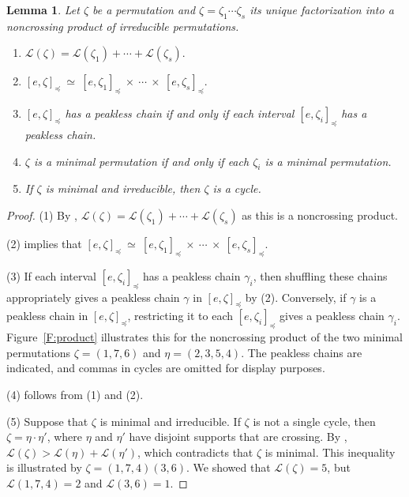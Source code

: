 \documentclass[12pt,oneside,reqno]{amsart}
\newtheorem{lemma}[theorem]{Lemma}
\theoremstyle{definition}
\numberwithin{equation}{section}
\newcommand{\calL}{{\mathcal L}}
\begin{document}
\begin{lemma}\label{L:properties-noncrossing-products}
    Let $\zeta$ be a permutation and $\zeta=\zeta_1\dotsb \zeta_s$ its unique
    factorization into a noncrossing product of irreducible permutations.
    \begin{enumerate}
        \item
            $\calL(\zeta)= \calL(\zeta_1)+\dotsb+\calL(\zeta_s).$

        \item
            $[e,\zeta]_\preceq\ \simeq\  [e,\zeta_1]_\preceq\ \times\ \dotsb\ \times\  [e,\zeta_s]_\preceq.$

        \item
            $[e,\zeta]_\preceq$ has a peakless chain if and only if each interval $[e,\zeta_i]_\preceq$ has a peakless chain.

        \item
            $\zeta$ is a minimal permutation if and only if each $\zeta_i$ is a minimal permutation.

        \item
            If $\zeta$ is minimal and irreducible, then $\zeta$ is a cycle.
    \end{enumerate}
\end{lemma}

\begin{proof}
    (1) By \cite[Lem.~3.3.1]{BS-Bruhat}, $\calL(\zeta)= \calL(\zeta_1)+\dotsb+\calL(\zeta_s)$ as this is a noncrossing product.

    (2) \cite[Lem.~3.3.3]{BS-Bruhat} implies that $[e,\zeta]_\preceq\ \simeq\  [e,\zeta_1]_\preceq\ \times\ \dotsb\ \times\  [e,\zeta_s]_\preceq$.

    (3) If each interval $[e, \zeta_i]_{\preceq}$ has a peakless chain
        $\gamma_i$, then shuffling these chains appropriately gives a peakless
        chain $\gamma$ in $[e,\zeta]_\preceq$ by (2). Conversely, if $\gamma$ is
        a peakless chain in  $[e,\zeta]_\preceq$, restricting it to each
        $[e,\zeta_i]_\preceq$ gives a peakless chain $\gamma_i$.
        Figure~\ref{F:product} illustrates this
        for the noncrossing product
        of the two minimal permutations $\zeta=(1,7,6)$ and $\eta=(2,3,5,4)$. The
        peakless chains are indicated, and commas in cycles are omitted for display
        purposes.

    (4) follows from (1) and (2).

    (5) Suppose that $\zeta$ is minimal and irreducible.
        If $\zeta$ is not a single cycle, then $\zeta=\eta\cdot \eta'$,
        where $\eta$ and $\eta'$ have disjoint supports that are crossing.
        By \cite[Lem.~3.3.1]{BS-Bruhat}, $\calL(\zeta)> \calL(\eta) + \calL(\eta')$, which contradicts that $\zeta$ is minimal.
        This inequality is illustrated by $\zeta=(1,7,4)(3,6)$.
        We showed that $\calL(\zeta)=5$, but $\calL(1,7,4) = 2$ and $\calL(3,6)=1$.
\end{proof}
\end{document}

